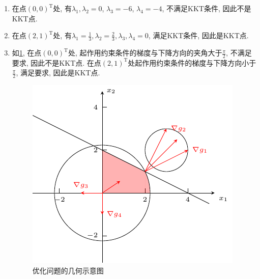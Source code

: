 \begin{enumerate}[label=\alph*)]
    \item 在点$(0,0)^\mathrm{T}$处, 有$\lambda_1,\lambda_2=0$, $\lambda_3=-6$, $\lambda_4=-4$, 不满足KKT条件, 因此不是KKT点.
    \item 在点$(2,1)^\mathrm{T}$处, 有$\lambda_1=\frac{1}{3}, \lambda_2=\frac{2}{3}, \lambda_3,\lambda_4=0$, 满足KKT条件, 因此是KKT点.
    \item
        如\cref{figure:7d}, 在点$(0,0)^\mathrm{T}$处, 起作用约束条件的梯度与下降方向的夹角大于$\frac{\pi}{2}$, 不满足要求, 因此不是KKT点.
        在点$(2,1)^\mathrm{T}$处起作用约束条件的梯度与下降方向小于$\frac{\pi}{2}$, 满足要求, 因此是KKT点.
        \begin{figure}[ht]
            \centering
            \includegraphics[scale = 1.2]{figures/7d.pdf}
            \caption{优化问题的几何示意图}
            \label{figure:7d}
        \end{figure}
\end{enumerate}
